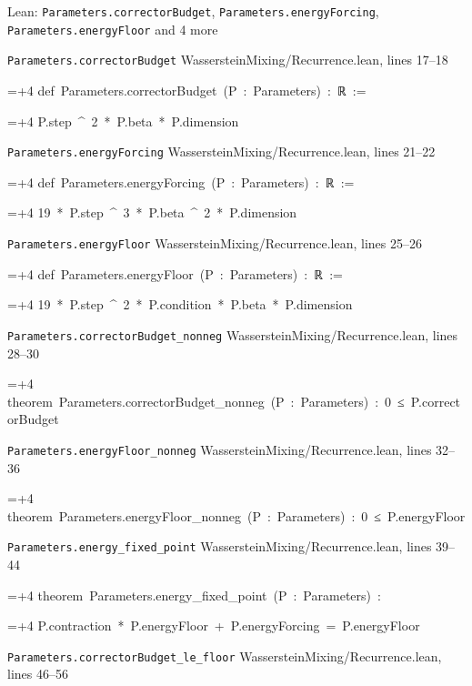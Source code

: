 \documentclass[11pt,a4paper]{report}
\newlength{\leancharwidth}
\newenvironment{leancode}{\par\smallskip\begingroup\ttfamily\footnotesize\raggedright
  \settowidth{\leancharwidth}{M}\setlength{\parskip}{0pt}\setlength{\parindent}{0pt}
  \frenchspacing}{\par\endgroup\smallskip}
\newcommand{\leanline}[2]{\hangindent=\dimexpr#1\leancharwidth+4\leancharwidth\relax
  \hangafter=1\noindent\hspace*{#1\leancharwidth}#2\par}
\newcommand{\leansource}[1]{\par{\footnotesize\color{leanmuted}#1}\par}
\begin{document}
\begin{leanbox}{Lean: \texttt{Parameters.\allowbreak{}correctorBudget}, \texttt{Parameters.\allowbreak{}energyForcing}, \texttt{Parameters.\allowbreak{}energyFloor} and 4 more}
\leansource{\texttt{Parameters.\allowbreak{}correctorBudget} \quad WassersteinMixing/\allowbreak{}Recurrence.lean, lines 17–18}
\begin{leancode}
\leanline{0}{def\ Parameters.correctorBudget\ (P\ :\ Parameters)\ :\ ℝ\ :=}
\leanline{2}{P.step\ \textasciicircum{}\ 2\ *\ P.beta\ *\ P.dimension}
\end{leancode}
\leansource{\texttt{Parameters.\allowbreak{}energyForcing} \quad WassersteinMixing/\allowbreak{}Recurrence.lean, lines 21–22}
\begin{leancode}
\leanline{0}{def\ Parameters.energyForcing\ (P\ :\ Parameters)\ :\ ℝ\ :=}
\leanline{2}{19\ *\ P.step\ \textasciicircum{}\ 3\ *\ P.beta\ \textasciicircum{}\ 2\ *\ P.dimension}
\end{leancode}
\leansource{\texttt{Parameters.\allowbreak{}energyFloor} \quad WassersteinMixing/\allowbreak{}Recurrence.lean, lines 25–26}
\begin{leancode}
\leanline{0}{def\ Parameters.energyFloor\ (P\ :\ Parameters)\ :\ ℝ\ :=}
\leanline{2}{19\ *\ P.step\ \textasciicircum{}\ 2\ *\ P.condition\ *\ P.beta\ *\ P.dimension}
\end{leancode}
\leansource{\texttt{Parameters.\allowbreak{}correctorBudget\_\allowbreak{}nonneg} \quad WassersteinMixing/\allowbreak{}Recurrence.lean, lines 28–30}
\begin{leancode}
\leanline{0}{theorem\ Parameters.correctorBudget\_nonneg\ (P\ :\ Parameters)\ :\ 0\ ≤\ P.correctorBudget}
\end{leancode}
\leansource{\texttt{Parameters.\allowbreak{}energyFloor\_\allowbreak{}nonneg} \quad WassersteinMixing/\allowbreak{}Recurrence.lean, lines 32–36}
\begin{leancode}
\leanline{0}{theorem\ Parameters.energyFloor\_nonneg\ (P\ :\ Parameters)\ :\ 0\ ≤\ P.energyFloor}
\end{leancode}
\leansource{\texttt{Parameters.\allowbreak{}energy\_\allowbreak{}fixed\_\allowbreak{}point} \quad WassersteinMixing/\allowbreak{}Recurrence.lean, lines 39–44}
\begin{leancode}
\leanline{0}{theorem\ Parameters.energy\_fixed\_point\ (P\ :\ Parameters)\ :}
\leanline{4}{P.contraction\ *\ P.energyFloor\ +\ P.energyForcing\ =\ P.energyFloor}
\end{leancode}
\leansource{\texttt{Parameters.\allowbreak{}correctorBudget\_\allowbreak{}le\_\allowbreak{}floor} \quad WassersteinMixing/\allowbreak{}Recurrence.lean, lines 46–56}

\end{leanbox}
\end{document}
